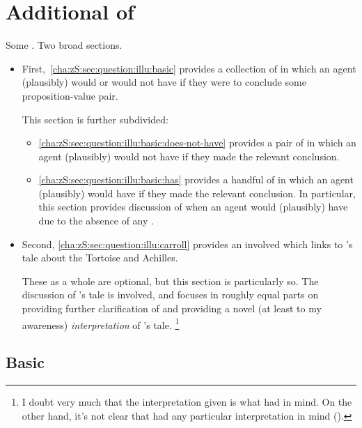 \chapter{Additional  of }
\label{cha:zS:sec:question:illu}

\begin{note}
  Some .
  Two broad sections.

  \begin{itemize}
  \item
    First,~\autoref{cha:zS:sec:question:illu:basic} provides a collection of  in which an agent (plausibly) would or would not have \zS{} if they were to conclude some proposition-value pair.

    This section is further subdivided:
    \begin{itemize}
    \item
      \autoref{cha:zS:sec:question:illu:basic:does-not-have} provides a pair of  in which an agent (plausibly) would not have \zS{} if they made the relevant conclusion.
    \item
      \autoref{cha:zS:sec:question:illu:basic:has} provides a handful of  in which an agent (plausibly) would have \zS{} if they made the relevant conclusion.
      In particular, this section provides discussion of when an agent would (plausibly) have \zS{} due to the absence of any .
    \end{itemize}
  \item
    Second, \autoref{cha:zS:sec:question:illu:carroll} provides an involved  which links \qzS{} to \citeauthor{Carroll:1895uj}'s tale about the Tortoise and Achilles.

    These  as a whole are optional, but this section is particularly so.
    The discussion of \citeauthor{Carroll:1895uj}'s tale is involved, and focuses in roughly equal parts on providing further clarification of \zS{} and providing a novel (at least to my awareness) \emph{interpretation} of \citeauthor{Carroll:1895uj}'s tale.%
    \footnote{
      I doubt very much that the interpretation given is what \citeauthor{Carroll:1895uj} had in mind.
      On the other hand, it's not clear that \citeauthor{Carroll:1895uj} had any particular interpretation in mind (\cite[Cf.][]{Thomson:2010tt}).
    }
  \end{itemize}
\end{note}

\section{Basic }
\label{cha:zS:sec:question:illu:basic}

